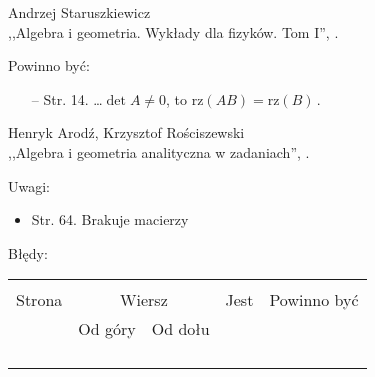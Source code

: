 \documentclass[a4paper,11pt]{article}
\begin{document}
\begin{center}
  Andrzej Staruszkiewicz \\
  ,,Algebra i geometria. Wykłady dla fizyków. Tom I'', \cite{ASAG}.
\end{center}


Powinno być:
\begin{itemize}
\item[--] Str. 14. \ldots $\det A \neq 0$, to
  $\textrm{rz} ( AB ) = \textrm{rz} ( B ) \, .$
\end{itemize}


\begin{center}
  Henryk Arodź, Krzysztof Rościszewski\\
  ,,Algebra i geometria analityczna w zadaniach'', \cite{AR}.
\end{center}


Uwagi:
\begin{itemize}
\item Str. 64. Brakuje macierzy %
\end{itemize}

Błędy:\\
\begin{tabular}{|c|c|c|c|c|}
  \hline
  & \multicolumn{2}{c|}{} & & \\
  Strona & \multicolumn{2}{c|}{Wiersz} & Jest
                            & Powinno być \\ \cline{2-3}
  & Od góry & Od dołu & & \\
  \hline
  & & & & \\
  & & & & \\
  & & & & \\
  & & & & \\
  \hline
\end{tabular}
\end{document}
